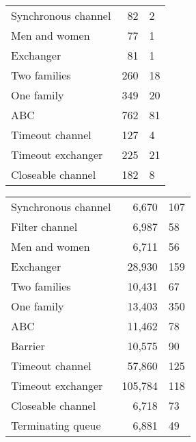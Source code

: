 \begin{figure}
\begin{minipage}{0.48\textwidth}%
\begin{tabular}{@{}lr@{$\null\pm\null$}l} %
Synchronous channel    & 82 & 2 \\
Men and women         & 77 &  1 \\
Exchanger            &  81 & 1 \\
Two families          & 260 & 18\\
One family            & 349 & 20\\
ABC      	       & 762 & 81\\
Timeout channel  	& 127	 & 4 \\
Timeout exchanger  	& 225	 & 21 \\
Closeable channel     & 182 & 8\\
\end{tabular}
\end{minipage}
\begin{minipage}{0.51\textwidth}
\begin{tabular}{lr@{$\null\pm\null$}l@{}} %
Synchronous channel  	& 6,670	 & 107 \\
Filter channel  	& 6,987	 & 58 \\
Men and women  	& 6,711	 & 56 \\
Exchanger  	& 28,930	 & 159 \\
Two families  	& 10,431	 & 67 \\
One family  	& 13,403	 & 350 \\
ABC  	& 11,462	 & 78 \\
Barrier  	& 10,575	 & 90 \\
Timeout channel  	& 57,860	 & 125 \\
Timeout exchanger  	& 105,784	 & 118 \\
Closeable channel  	& 6,718	 & 73 \\
Terminating queue  	& 6,881	 & 49

\end{tabular}
\end{minipage}
\end{figure}
